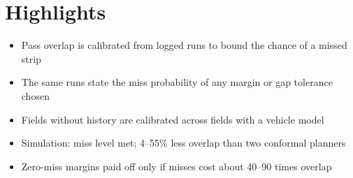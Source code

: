\documentclass[12pt]{article}
\begin{document}
\section*{Highlights}
\begin{itemize}
\item Pass overlap is calibrated from logged runs to bound the chance of a missed strip
\item The same runs state the miss probability of any margin or gap tolerance chosen
\item Fields without history are calibrated across fields with a vehicle model
\item Simulation: miss level met; 4--55\% less overlap than two conformal planners
\item Zero-miss margins paid off only if misses cost about 40--90 times overlap
\end{itemize}
\end{document}
